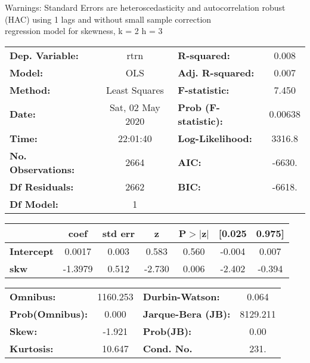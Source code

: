 Warnings: \newline
 [1] Standard Errors are heteroscedasticity and autocorrelation robust (HAC) using 1 lags and without small sample correction\\ 

regression model for skewness, k = 2 h = 3\begin{center}
\begin{tabular}{lclc}
\toprule
\textbf{Dep. Variable:}    &       rtrn       & \textbf{  R-squared:         } &     0.008   \\
\textbf{Model:}            &       OLS        & \textbf{  Adj. R-squared:    } &     0.007   \\
\textbf{Method:}           &  Least Squares   & \textbf{  F-statistic:       } &     7.450   \\
\textbf{Date:}             & Sat, 02 May 2020 & \textbf{  Prob (F-statistic):} &  0.00638    \\
\textbf{Time:}             &     22:01:40     & \textbf{  Log-Likelihood:    } &    3316.8   \\
\textbf{No. Observations:} &        2664      & \textbf{  AIC:               } &    -6630.   \\
\textbf{Df Residuals:}     &        2662      & \textbf{  BIC:               } &    -6618.   \\
\textbf{Df Model:}         &           1      & \textbf{                     } &             \\
\bottomrule
\end{tabular}
\begin{tabular}{lcccccc}
                   & \textbf{coef} & \textbf{std err} & \textbf{z} & \textbf{P$> |$z$|$} & \textbf{[0.025} & \textbf{0.975]}  \\
\midrule
\textbf{Intercept} &       0.0017  &        0.003     &     0.583  &         0.560        &       -0.004    &        0.007     \\
\textbf{skw}       &      -1.3979  &        0.512     &    -2.730  &         0.006        &       -2.402    &       -0.394     \\
\bottomrule
\end{tabular}
\begin{tabular}{lclc}
\textbf{Omnibus:}       & 1160.253 & \textbf{  Durbin-Watson:     } &    0.064  \\
\textbf{Prob(Omnibus):} &   0.000  & \textbf{  Jarque-Bera (JB):  } & 8129.211  \\
\textbf{Skew:}          &  -1.921  & \textbf{  Prob(JB):          } &     0.00  \\
\textbf{Kurtosis:}      &  10.647  & \textbf{  Cond. No.          } &     231.  \\
\bottomrule
\end{tabular}
\end{center}


